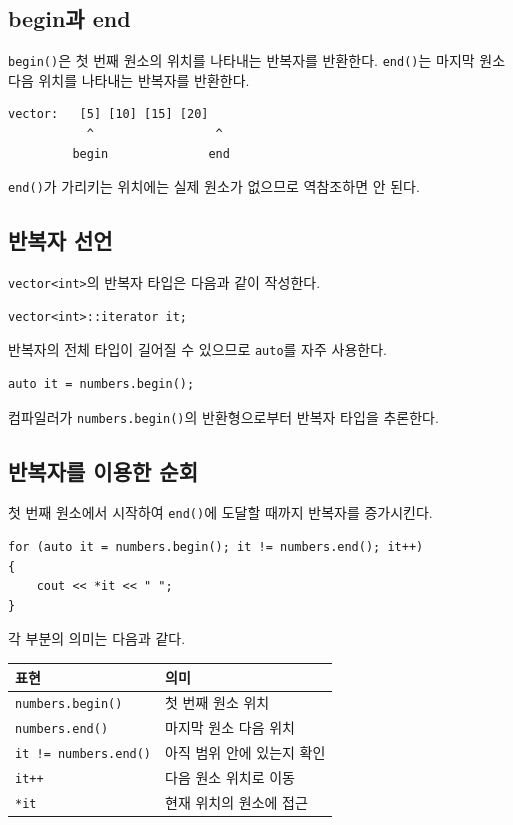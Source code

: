 \documentclass[11pt,a4paper]{article}
\begin{document}
\subsection{begin과 end}
\texttt{begin()}은 첫 번째 원소의 위치를 나타내는 반복자를 반환한다. \texttt{end()}는 마지막 원소 다음 위치를 나타내는 반복자를 반환한다.

\begin{verbatim}
vector:   [5] [10] [15] [20]
           ^                 ^
         begin              end
\end{verbatim}

\texttt{end()}가 가리키는 위치에는 실제 원소가 없으므로 역참조하면 안 된다.

\subsection{반복자 선언}
\texttt{vector<int>}의 반복자 타입은 다음과 같이 작성한다.

\begin{lstlisting}
vector<int>::iterator it;
\end{lstlisting}

반복자의 전체 타입이 길어질 수 있으므로 \texttt{auto}를 자주 사용한다.

\begin{lstlisting}
auto it = numbers.begin();
\end{lstlisting}

컴파일러가 \texttt{numbers.begin()}의 반환형으로부터 반복자 타입을 추론한다.

\subsection{반복자를 이용한 순회}
첫 번째 원소에서 시작하여 \texttt{end()}에 도달할 때까지 반복자를 증가시킨다.

\begin{lstlisting}
for (auto it = numbers.begin(); it != numbers.end(); it++)
{
    cout << *it << " ";
}
\end{lstlisting}

각 부분의 의미는 다음과 같다.

\begin{center}
\begin{tabular}{ll}
\toprule
표현 & 의미 \\
\midrule
\texttt{numbers.begin()} & 첫 번째 원소 위치 \\
\texttt{numbers.end()} & 마지막 원소 다음 위치 \\
\texttt{it != numbers.end()} & 아직 범위 안에 있는지 확인 \\
\texttt{it++} & 다음 원소 위치로 이동 \\
\texttt{*it} & 현재 위치의 원소에 접근 \\
\bottomrule
\end{tabular}
\end{center}
\end{document}
